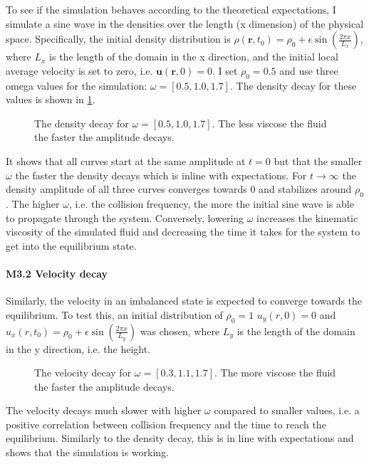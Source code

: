 \documentclass[a4paper,12pt, oneside]{book}
\begin{document}
To see if the simulation behaves according to the theoretical expectations, I simulate a sine wave in the densities over the length (x dimension) of the physical space.
Specifically, the initial density distribution is $\rho (\textbf{r},t_{0})=\rho_{0}+\epsilon \sin \left( \frac{2\pi x}{L_{x}} \right)$, where $L_{x}$ is the length of the domain in the x direction, and the initial local average velocity is set to zero, i.e. $\textbf{u}(\textbf{r},0)=0$.
I set $\rho_{0}=0.5$ and use three omega values for the simulation: $\omega=[0.5,1.0,1.7]$.
The density decay for these values is shown in \ref{fig:m3-1}.
\begin{figure}[ht]
\centering
\resizebox{\columnwidth}{!}{\large}
\vspace*{-10mm}
\caption[Density decay]{The density decay for $\omega=[0.5,1.0,1.7]$. The less viscose the fluid the faster the amplitude decays.}
\label{fig:m3-1}
\end{figure}
It shows that all curves start at the same amplitude at $t=0$ but that the smaller $\omega$ the faster the density decays which is inline with expectations. 
For $t\rightarrow \infty$ the density amplitude of all three curves converges towards $0$ and stabilizes around $\rho_{0}$.
The higher $\omega$, i.e. the collision frequency, the more the initial sine wave is able to propagate through the system. Conversely, lowering $\omega$ increases the kinematic viscosity of the simulated fluid and decreasing the time it takes for the system to get into the equilibrium state.


\paragraph{M3.2 Velocity decay}
Similarly, the velocity in an imbalanced state is expected to converge towards the equilibrium.
To test this, an initial distribution of $\rho_{0}=1$ $u_{y}(r,0)=0$ and $u_{x}(r,t_{0})=\rho_{0}+\epsilon \sin \left( \frac{2\pi x}{L_{y}} \right)$ was chosen, where $L_{y}$ is the length of the domain in the y direction, i.e. the height.
\begin{figure}[ht]
\centering
\resizebox{\columnwidth}{!}{\large}
\vspace*{-10mm}
\caption[Velocity decay]{The velocity decay for $\omega=[0.3,1.1,1.7]$. The more viscose the fluid the faster the amplitude decays.}
\label{fig:m3-2-vel}
\end{figure}
The velocity decays much slower with higher $\omega$ compared to smaller values, i.e. a positive correlation between collision frequency and the time to reach the equilibrium.
Similarly to the density decay, this is in line with expectations and shows that the simulation is working.
\end{document}
